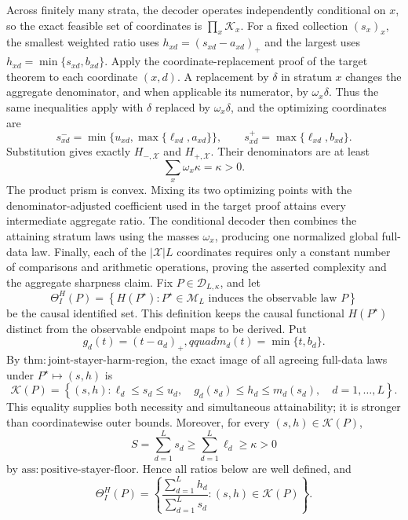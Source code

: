 Across finitely many strata, the decoder operates independently conditional on \(x\), so the exact feasible set of coordinates is \(\prod_x\mathcal K_x\).  For a fixed collection \((s_x)_x\), the smallest weighted ratio uses \(h_{xd}=(s_{xd}-a_{xd})_+\) and the largest uses \(h_{xd}=\min\{s_{xd},b_{xd}\}\).  Apply the coordinate-replacement proof of the target theorem to each coordinate \((x,d)\).  A replacement by \(\delta\) in stratum \(x\) changes the aggregate denominator, and when applicable its numerator, by \(\omega_x\delta\).  Thus the same inequalities apply with \(\delta\) replaced by \(\omega_x\delta\), and the optimizing coordinates are
\[s_{xd}^-=\min\{u_{xd},\max\{\ell_{xd},a_{xd}\}\},\qquad
s_{xd}^+=\max\{\ell_{xd},b_{xd}\}.\]
Substitution gives exactly \(H_{-,\mathcal X}\) and \(H_{+,\mathcal X}\).  Their denominators are at least
\[\sum_x\omega_x\kappa=\kappa>0.\]
The product prism is convex.  Mixing its two optimizing points with the denominator-adjusted coefficient used in the target proof attains every intermediate aggregate ratio.  The conditional decoder then combines the attaining stratum laws using the masses \(\omega_x\), producing one normalized global full-data law.  Finally, each of the \(|\mathcal X|L\) coordinates requires only a constant number of comparisons and arithmetic operations, proving the asserted complexity and the aggregate sharpness claim.
Fix \(P\in\mathcal D_{L,\kappa}\), and let
\[\Theta_I^H(P)=\left\{H(P^{\star}):P^{\star}\in\mathcal M_L\text{ induces the observable law }P\right\}\]
be the causal identified set.  This definition keeps the causal functional \(H(P^{\star})\) distinct from the observable endpoint maps to be derived.  Put
\[g_d(t)=(t-a_d)_+,qquad m_d(t)=\min\{t,b_d\}.\]
By \(\mathrm{thm{:}joint\mbox{-}stayer\mbox{-}harm\mbox{-}region}\), the exact image of all agreeing full-data laws under \(P^{\star}\mapsto(s,h)\) is
\[\mathcal K(P)=\left\{(s,h):\ell_d\le s_d\le u_d,\quad
g_d(s_d)\le h_d\le m_d(s_d),\quad d=1,\ldots,L\right\}.\]
This equality supplies both necessity and simultaneous attainability; it is stronger than coordinatewise outer bounds.  Moreover, for every \((s,h)\in\mathcal K(P)\),
\[S=\sum_{d=1}^{L}s_d\ge\sum_{d=1}^{L}\ell_d\ge\kappa>0\]
by \(\mathrm{ass{:}positive\mbox{-}stayer\mbox{-}floor}\).  Hence all ratios below are well defined, and
\[\Theta_I^H(P)=\left\{\frac{\sum_{d=1}^{L}h_d}{\sum_{d=1}^{L}s_d}:(s,h)\in\mathcal K(P)\right\}.\]

